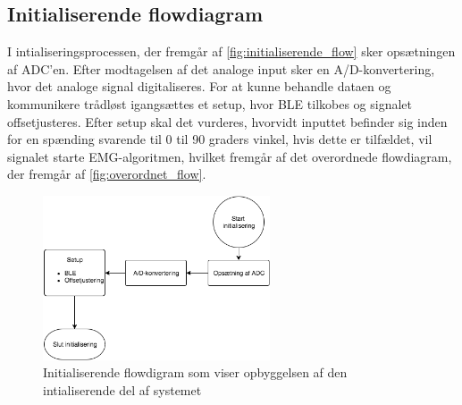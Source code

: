 \subsection{Initialiserende flowdiagram}
I intialiseringsprocessen, der fremgår af \autoref{fig:initialiserende_flow} sker opsætningen af ADC'en. Efter modtagelsen af det analoge input sker en A/D-konvertering, hvor det analoge signal digitaliseres. For at kunne behandle dataen og kommunikere trådløst igangsættes et setup, hvor BLE tilkobes og signalet offsetjusteres. Efter setup skal det vurderes, hvorvidt inputtet befinder sig inden for en spænding svarende til 0 til 90 graders vinkel, hvis dette er tilfældet, vil signalet starte EMG-algoritmen, hvilket fremgår af det overordnede flowdiagram, der fremgår af \autoref{fig:overordnet_flow}. 
\begin{figure}[H]
\centering
\includegraphics[width=0.6\textwidth]{figures/implementering/initialiserende_flow.png}
\caption{Initialiserende flowdigram som viser opbyggelsen af den intialiserende del af systemet}
\label{fig:initialiserende_flow}
\end{figure}

